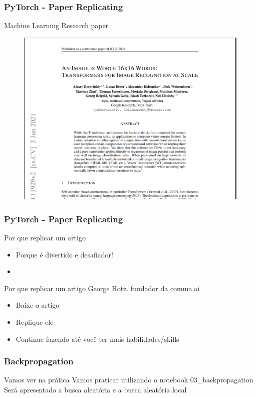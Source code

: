 \documentclass{beamer}
\begin{document}
\begin{frame}
	\frametitle{PyTorch - Paper Replicating}
	\begin{block}{Machine Learning Research paper}
	\begin{figure}
		\centering
		\includegraphics[width=0.7\linewidth]{figures/an-image-is-worth-16x16-words-transformers-1}
	\end{figure}
	\end{block}
\end{frame} 
\begin{frame}
	\frametitle{PyTorch - Paper Replicating}
	\begin{block}{Por que replicar um artigo}
		\begin{itemize}
			\item Porque é divertido e desafiador!
			\item 
		\end{itemize}
	\end{block}
	\begin{block}{Por que replicar um artigo}
		George Hotz. fundador da comma.ai
		\begin{itemize}
			\item Baixe o artigo
			\item Replique ele
			\item Continue fazendo até você ter mais habilidades/skills
		\end{itemize}
	\end{block}
\end{frame} 
\begin{frame}
	\frametitle{Backpropagation}
	\begin{block}{Vamos ver na prática}
		Vamos praticar utilizando o notebook 03\_backpropagation
		Será apresentado a busca aleatória e a busca aleatória local
	\end{block}
\end{frame}
\end{document}
